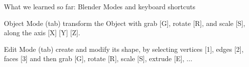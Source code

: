 \documentclass[aspectratio=169]{beamer}
\begin{document}
\begin{frame}[fragile]{What we learned so far: \linebreak Blender Modes and keyboard shortcuts}
    \begin{vfilleditems}
        \item Object Mode (tab)
        {\small \linebreak transform the Object
        \linebreak with grab [G], rotate [R], and scale [S],
        \linebreak along the axis [X] [Y] [Z].}
        \item Edit Mode (tab)
        {\small \linebreak create and modify its shape,
        \linebreak by selecting vertices [1], edges [2], faces [3]
        \linebreak and then grab [G], rotate [R], scale [S], extrude [E], ...}
    \end{vfilleditems}
\end{frame}
\end{document}

